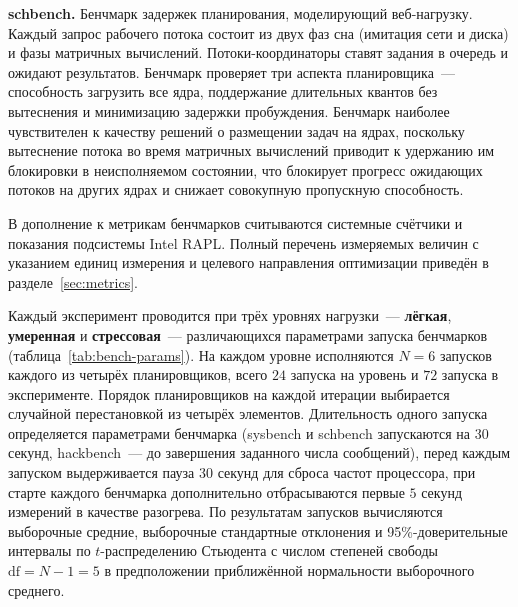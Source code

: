 \documentclass[14pt, oneside]{extbook}
\begin{document}
        \textbf{schbench.}
        Бенчмарк задержек планирования, моделирующий
        веб-нагрузку. Каждый запрос рабочего потока состоит из
        двух фаз сна (имитация сети и диска) и фазы матричных
        вычислений. Потоки-координаторы ставят задания в очередь
        и ожидают результатов. Бенчмарк проверяет три аспекта
        планировщика~--- способность загрузить все ядра,
        поддержание длительных квантов без вытеснения и
        минимизацию задержки пробуждения.
        Бенчмарк наиболее чувствителен к качеству решений о
        размещении задач на ядрах, поскольку вытеснение потока во время
        матричных вычислений приводит к удержанию им блокировки
        в неисполняемом состоянии, что блокирует прогресс ожидающих
        потоков на других ядрах и снижает совокупную пропускную
        способность.

        В дополнение к метрикам бенчмарков считываются
        системные счётчики и показания подсистемы Intel RAPL.
        Полный перечень измеряемых величин с указанием единиц
        измерения и целевого направления оптимизации приведён
        в разделе~\ref{sec:metrics}.

        Каждый эксперимент проводится при трёх уровнях
        нагрузки~--- \textbf{лёгкая}, \textbf{умеренная} и
        \textbf{стрессовая}~--- различающихся параметрами запуска
        бенчмарков (таблица~\ref{tab:bench-params}). На каждом
        уровне исполняются $N = 6$ запусков каждого из четырёх
        планировщиков, всего $24$ запуска на уровень и $72$
        запуска в эксперименте. Порядок планировщиков на каждой
        итерации выбирается случайной перестановкой из четырёх
        элементов. Длительность одного запуска
        определяется параметрами бенчмарка
        (sysbench и schbench запускаются на $30$ секунд,
        hackbench~--- до завершения заданного числа сообщений),
        перед каждым запуском выдерживается пауза $30$ секунд
        для сброса частот процессора, при старте каждого
        бенчмарка дополнительно отбрасываются первые $5$ секунд
        измерений в качестве разогрева.
        По результатам запусков вычисляются выборочные средние,
        выборочные стандартные отклонения и
        95\%-доверительные интервалы по $t$-распределению
        Стьюдента с числом степеней свободы $\mathrm{df} = N - 1 = 5$
        в предположении приближённой нормальности выборочного
        среднего.
\end{document}
